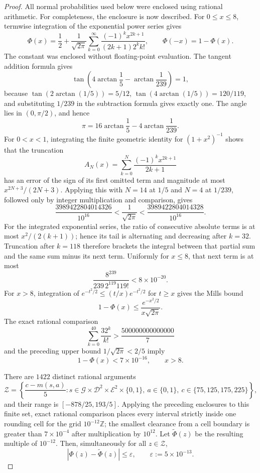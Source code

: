\documentclass{article}
\begin{document}
\begin{proof}
All normal probabilities used below were enclosed using rational
arithmetic.  For completeness, the enclosure is now described.  For
\(0\le x\le8\), termwise integration of the exponential power series
gives
\[
 \Phi(x)=\frac12+\frac1{\sqrt{2\pi}}
 \sum_{k=0}^{\infty}\frac{(-1)^kx^{2k+1}}{(2k+1)2^kk!},
 \qquad \Phi(-x)=1-\Phi(x).
\]
The constant was enclosed without floating-point evaluation.  The
tangent addition formula gives
\[
 \tan\!\left(4\arctan\frac15-\arctan\frac1{239}\right)=1,
\]
because \(\tan(2\arctan(1/5))=5/12\),
\(\tan(4\arctan(1/5))=120/119\), and substituting
\(1/239\) in the subtraction formula gives exactly one.  The angle
lies in \((0,\pi/2)\), and hence
\[
 \pi=16\arctan\frac15-4\arctan\frac1{239}.
\]
For \(0<x<1\), integrating the finite geometric identity for
\((1+x^2)^{-1}\) shows that the truncation
\[
 A_N(x)=\sum_{k=0}^N\frac{(-1)^kx^{2k+1}}{2k+1}
\]
has an error of the sign of its first omitted term and magnitude at
most \(x^{2N+3}/(2N+3)\).  Applying this with \(N=14\) at \(1/5\)
and \(N=4\) at \(1/239\), followed only by integer multiplication and
comparison, gives
\[
 \frac{3989422804014326}{10^{16}}
 <\frac1{\sqrt{2\pi}}<
 \frac{3989422804014328}{10^{16}}.
\]
For the integrated exponential series, the ratio of consecutive
absolute terms is at most \(x^2/(2(k+1))\); hence its tail is
alternating and decreasing after \(k=32\).  Truncation after \(k=118\)
therefore brackets the integral between that partial sum and the same
sum minus its next term.  Uniformly for \(x\le8\), that next term is at
most
\[
 \frac{8^{239}}{239\,2^{119}119!}<8\times10^{-20}.
\]
For \(x>8\), integration of
\(e^{-t^2/2}\le(t/x)e^{-t^2/2}\) for \(t\ge x\) gives the Mills bound
\[
 1-\Phi(x)\le\frac{e^{-x^2/2}}{x\sqrt{2\pi}}.
\]
The exact rational comparison
\[
 \sum_{k=0}^{40}\frac{32^k}{k!}>
 \frac{500000000000000}{7}
\]
and the preceding upper bound \(1/\sqrt{2\pi}<2/5\) imply
\[
 1-\Phi(x)<7\times10^{-16},\qquad x>8.
\]

There are \(1422\) distinct rational arguments
\[
 \mathcal Z=\left\{\frac{c-m(s,a)}5:
 s\in\mathcal G\times\mathcal D^2\times\mathcal E^2\times\{0,1\},
 \ a\in\{0,1\},\ c\in\{75,125,175,225\}\right\},
\]
and their range is \([-878/25,193/5]\).  Applying the preceding
enclosures to this finite set, exact rational comparison places every
interval strictly inside one rounding cell for the grid
\(10^{-12}\mathbb Z\); the smallest clearance from a cell boundary is
greater than \(7\times10^{-4}\) after multiplication by \(10^{12}\).
Let \(\widetilde\Phi(z)\) be the resulting multiple of \(10^{-12}\).
Then, simultaneously for all \(z\in\mathcal Z\),
\[
 |\Phi(z)-\widetilde\Phi(z)|\le\varepsilon,
 \qquad \varepsilon:=5\times10^{-13}.
\]


\end{proof}
\end{document}
